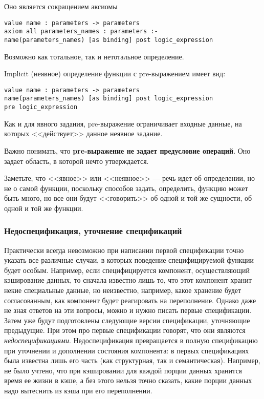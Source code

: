 \documentclass[14pt, twoside]{extreport}
\newcommand{\head}[1]{\vspace{1cm}\subsubsection*{#1}}
\begin{document}
Оно является сокращением аксиомы
\begin{lstlisting}
value name : parameters -> parameters
axiom all parameters_names : parameters :-
name(parameters_names) [as binding] post logic_expression
\end{lstlisting}

Возможно как тотальное, так и нетотальное определение.

Implicit (неявное) определение функции с pre-выражением имеет вид:
\begin{lstlisting}
value name : parameters -> parameters
name(parameters_names) [as binding] post logic_expression
pre logic_expression
\end{lstlisting}

Как и для явного задания, pre-выражение ограничивает входные данные, на которых <<действует>> данное неявное задание.

Важно понимать, что \textbf{pre-выражение не задает предусловие операций}. Оно задает область, в которой нечто утверждается.

Заметьте, что <<явное>> или <<неявное>> --- речь идет об определении, но не о самой функции, поскольку способов задать, определить, функцию может быть много, но все они будут <<говорить>> об одной и той же сущности, об одной и той же функции.
 

\head{Недоспецификация, уточнение спецификаций}

Практически всегда невозможно при написании первой спецификации точно указать все различные случаи, в которых поведение специфицируемой функции будет особым. Например, если специфицируется компонент, осуществляющий кэширование данных, то сначала известно лишь то, что этот компонент хранит некие специальные данные, но неизвестно, например, какое хранение будет согласованным, как компонент будет реагировать на переполнение. Однако даже не зная ответов на эти вопросы, можно и нужно писать первые спецификации. Затем уже будут подготовлены следующие версии спецификации, уточняющие предыдущие. При этом про первые спецификации говорят, что они являются \emph{недоспецификациями}. Недоспецификация превращается в полную спецификацию при уточнении и дополнении состояния компонента: в первых спецификациях была известна лишь его часть (как структурная, так и семантическая). Например, не было учтено, что при кэшировании для каждой порции данных хранится время ее жизни в кэше, а без этого нельзя точно сказать, какие порции данных надо вытеснить из кэша при его переполнении.
\end{document}
